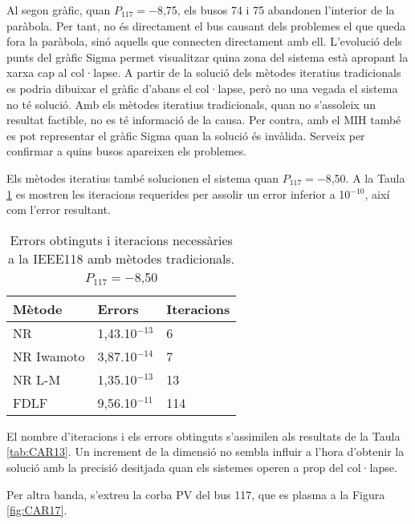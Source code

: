 Al segon gràfic, quan $P_{117}=-$8,75, els busos 74 i 75 abandonen l'interior de la paràbola. Per tant, no és directament el bus causant dels problemes el que queda fora la paràbola, sinó aquells que connecten directament amb ell. L'evolució dels punts del gràfic Sigma permet visualitzar quina zona del sistema està apropant la xarxa cap al col·lapse. A partir de la solució dels mètodes iteratius tradicionals es podria dibuixar el gràfic d'abans el col·lapse, però no una vegada el sistema no té solució. Amb els mètodes iteratius tradicionals, quan no s'assoleix un resultat factible, no es té informació de la causa. Per contra, amb el MIH també es pot representar el gràfic Sigma quan la solució és invàlida. Serveix per confirmar a quins busos apareixen els problemes. 

Els mètodes iteratius també solucionen el sistema quan $P_{117}=-$8,50. A la Taula \ref{tab:CAR17x} es mostren les iteracions requerides per assolir un error inferior a 10$^{-10}$, així com l'error resultant. 

\begin{table}[!htb]
  \begin{center}
  \begin{tabular}{lll}
  \hline
  Mètode & Errors & Iteracions\\
  \hline
  \hline
  NR & 1,43.10$^{-13}$ & 6\\ 
  NR Iwamoto & 3,87.10$^{-14}$ & 7\\
  NR L-M & 1,35.10$^{-13}$ & 13\\ 
  FDLF & 9,56.10$^{-11}$ & 114\\
  \hline 
  \end{tabular}
  \caption{Errors obtinguts i iteracions necessàries a la IEEE118 amb mètodes tradicionals. $P_{117}=-$8,50}
  \label{tab:CAR17x}
  \end{center}
\end{table}

El nombre d'iteracions i els errors obtinguts s'assimilen als resultats de la Taula \ref{tab:CAR13}. Un increment de la dimensió no sembla influir a l'hora d'obtenir la solució amb la precisió desitjada quan els sistemes operen a prop del col·lapse.

Per altra banda, s'extreu la corba PV del bus 117, que es plasma a la Figura \ref{fig:CAR17}.

